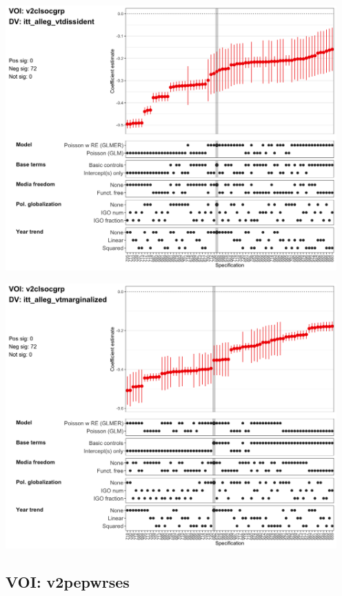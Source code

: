 \documentclass[]{article}
\begin{document}
\includegraphics[height=4in]{../output/figures-robustness/specplot-v2clsocgrp-itt_alleg_vtdissident.png}

\includegraphics[height=4in]{../output/figures-robustness/specplot-v2clsocgrp-itt_alleg_vtmarginalized.png}

\hypertarget{voi-v2pepwrses}{%
\subsection{VOI: v2pepwrses}\label{voi-v2pepwrses}}
\end{document}
